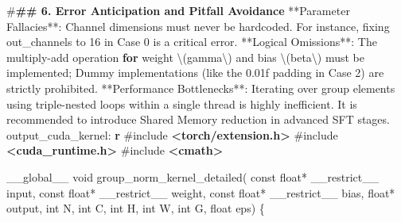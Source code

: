 \documentclass[
  10
]{article}
\newenvironment{Shaded}{}{}
\newcommand{\BuiltInTok}[1]{\textcolor[rgb]{0.00,0.50,0.00}{#1}}
\newcommand{\CharTok}[1]{\textcolor[rgb]{0.25,0.44,0.63}{#1}}
\newcommand{\ControlFlowTok}[1]{\textcolor[rgb]{0.00,0.44,0.13}{\textbf{#1}}}
\newcommand{\DataTypeTok}[1]{\textcolor[rgb]{0.56,0.13,0.00}{#1}}
\newcommand{\DecValTok}[1]{\textcolor[rgb]{0.25,0.63,0.44}{#1}}
\newcommand{\ErrorTok}[1]{\textcolor[rgb]{1.00,0.00,0.00}{\textbf{#1}}}
\newcommand{\FloatTok}[1]{\textcolor[rgb]{0.25,0.63,0.44}{#1}}
\newcommand{\ImportTok}[1]{\textcolor[rgb]{0.00,0.50,0.00}{\textbf{#1}}}
\newcommand{\NormalTok}[1]{#1}
\newcommand{\OperatorTok}[1]{\textcolor[rgb]{0.40,0.40,0.40}{#1}}
\newcommand{\PreprocessorTok}[1]{\textcolor[rgb]{0.74,0.48,0.00}{#1}}
\begin{document}
\begin{Shaded}
\begin{Highlighting}[]
\PreprocessorTok{\#}\ErrorTok{\#\# 6. Error Anticipation and Pitfall Avoidance}
\OperatorTok{**}\NormalTok{Parameter Fallacies}\OperatorTok{**:}\NormalTok{ Channel dimensions must never be hardcoded}\OperatorTok{.}\NormalTok{ For instance}\OperatorTok{,}\NormalTok{ fixing \textasciigrave{}out\_channels\textasciigrave{} to }\DecValTok{16}\NormalTok{ in Case }\DecValTok{0}\NormalTok{ is a critical error}\OperatorTok{.}
\OperatorTok{**}\NormalTok{Logical Omissions}\OperatorTok{**:}\NormalTok{ The multiply}\OperatorTok{{-}}\NormalTok{add operation }\ControlFlowTok{for}\NormalTok{ weight \textbackslash{}}\OperatorTok{(}\NormalTok{gamma\textbackslash{}}\OperatorTok{)}\NormalTok{ and bias \textbackslash{}}\OperatorTok{(}\NormalTok{beta\textbackslash{}}\OperatorTok{)}\NormalTok{ must be implemented}\OperatorTok{;}\NormalTok{ Dummy implementations }\OperatorTok{(}\NormalTok{like the }\FloatTok{0.01}\BuiltInTok{f}\NormalTok{ padding in Case }\DecValTok{2}\OperatorTok{)}\NormalTok{ are strictly prohibited}\OperatorTok{.}
\OperatorTok{**}\NormalTok{Performance Bottlenecks}\OperatorTok{**:}\NormalTok{ Iterating over group elements using triple}\OperatorTok{{-}}\NormalTok{nested loops within a single thread is highly inefficient}\OperatorTok{.}\NormalTok{ It is recommended to introduce Shared Memory reduction in advanced SFT stages}\OperatorTok{.}
\NormalTok{\textasciigrave{}\textasciigrave{}\textasciigrave{}}\CharTok{\textquotesingle{}}
\NormalTok{\textasciigrave{}\textasciigrave{}\textasciigrave{}}\CharTok{\textquotesingle{}}
\NormalTok{\textasciigrave{}\textasciigrave{}output\_cuda\_kernel}\CharTok{\textquotesingle{}:}\ErrorTok{ r\textasciigrave{}\textasciigrave{}\textasciigrave{}}\CharTok{\textquotesingle{}}
\PreprocessorTok{\#include }\ImportTok{\textless{}torch/extension.h\textgreater{}}
\PreprocessorTok{\#include }\ImportTok{\textless{}cuda\_runtime.h\textgreater{}}
\PreprocessorTok{\#include }\ImportTok{\textless{}cmath\textgreater{}}

\NormalTok{\_\_global\_\_ }\DataTypeTok{void}\NormalTok{ group\_norm\_kernel\_detailed}\OperatorTok{(}
    \DataTypeTok{const} \DataTypeTok{float}\OperatorTok{*}\NormalTok{ \_\_restrict\_\_ input}\OperatorTok{,}
    \DataTypeTok{const} \DataTypeTok{float}\OperatorTok{*}\NormalTok{ \_\_restrict\_\_ weight}\OperatorTok{,}
    \DataTypeTok{const} \DataTypeTok{float}\OperatorTok{*}\NormalTok{ \_\_restrict\_\_ bias}\OperatorTok{,}
    \DataTypeTok{float}\OperatorTok{*}\NormalTok{ output}\OperatorTok{,}
    \DataTypeTok{int}\NormalTok{ N}\OperatorTok{,} \DataTypeTok{int}\NormalTok{ C}\OperatorTok{,} \DataTypeTok{int}\NormalTok{ H}\OperatorTok{,} \DataTypeTok{int}\NormalTok{ W}\OperatorTok{,} \DataTypeTok{int}\NormalTok{ G}\OperatorTok{,} \DataTypeTok{float}\NormalTok{ eps}\OperatorTok{)} \OperatorTok{\{}


\end{Highlighting}
\end{Shaded}
\end{document}
